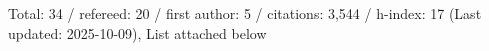 Total: 34 / refereed: 20 / first author: 5 / citations: 3,544 / h-index: 17 (Last updated: 2025-10-09), List attached below